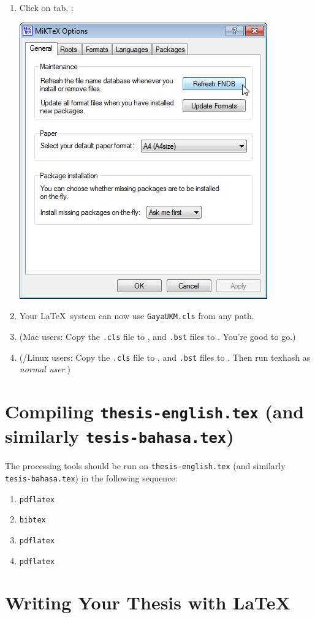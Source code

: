 \documentclass[a4paper,12pt]{scrartcl}
\begin{document}
\begin{enumerate}
\item Click on  tab, :
\begin{center}
\includegraphics[width=.455\linewidth]{refresh-fndb}
\end{center}
\item Your \LaTeX\ system can now use \texttt{GayaUKM.cls} from any path.
\item (Mac users: Copy the \texttt{.cls} file to , and \texttt{.bst} files to . You're good to go.)
\item (/Linux users: Copy the \texttt{.cls} file to , and \texttt{.bst} files to . Then run {\ttfamily texhash} as \emph{normal user}.)
\end{enumerate}

\section{Compiling \texttt{thesis-english.tex} (and similarly \texttt{tesis-bahasa.tex})}
The processing tools should be run on \texttt{thesis-english.tex} (and similarly \texttt{tesis-bahasa.tex}) in the following sequence:
\begin{enumerate}[noitemsep]
\item \texttt{pdflatex}
\item \texttt{bibtex}
\item \texttt{pdflatex}
\item \texttt{pdflatex}
\end{enumerate}


\section{Writing Your Thesis with \LaTeX}\label{sec:latex:howto}
\end{document}
